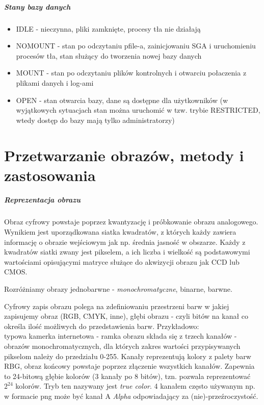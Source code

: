 \documentclass[]{report}
\begin{document}
\paragraph{Stany bazy danych}

\begin{itemize}
\item IDLE - nieczynna, pliki zamknięte, procesy tła nie działają 
\item NOMOUNT - stan po odczytaniu pfile-a, zainicjowaniu SGA i uruchomieniu procesów tła, stan służący do tworzenia nowej bazy danych

\item MOUNT - stan po odczytaniu plików kontrolnych i otwarciu połaczenia z plikami danych i log-ami

\item OPEN - stan otwarcia bazy, dane są dostępne dla użytkowników (w wyjątkowych sytuacjach stan można uruchomić w tzw. trybie RESTRICTED, wtedy dostęp do bazy mają tylko administratorzy)

\end{itemize}

\chapter{Przetwarzanie obrazów, metody i zastosowania}
\paragraph{Reprezentacja obrazu}
Obraz cyfrowy powstaje poprzez kwantyzację i próbkowanie obrazu analogowego. Wynikiem jest uporządkowana siatka kwadratów, z których każdy zawiera informację o obrazie wejściowym jak np. średnia jasność w obszarze. Każdy z kwadratów siatki zwany jest pikselem, a ich liczba i wielkość są podstawowymi wartościami opisującymi matryce służące do akwizycji obrazu jak CCD lub CMOS.

Rozróżniamy obrazy jednobarwne - \textit{monochromatyczne}, binarne, barwne.

Cyfrowy zapis obrazu polega na zdefiniowaniu przestrzeni barw w jakiej zapisujemy obraz (RGB, CMYK, inne), głębi obrazu - czyli bitów na kanał co określa ilość możliwych do przedstawienia barw. Przykładowo: \\
typowa kamerka internetowa - ramka obrazu składa się z trzech kanałów - obrazów monochromatycznych, dla których zakres wartości przypisywanych pikselom należy do przedziału 0-255. Kanały reprezentują kolory z palety barw RBG, obraz końcowy powstaje poprzez złączenie wszystkich kanałów. 
Zapewnia to 24-bitową głębie kolorów (3 kanały po 8 bitów), tzn. pozwala reprezentować $2^{24}$  kolorów. Tryb ten nazywany jest \textit{true color}. 
4 kanałem często używanym np. w formacie png może być kanał A \textit{Alpha} odpowiadający za (nie)-przeźroczystość.
\end{document}
